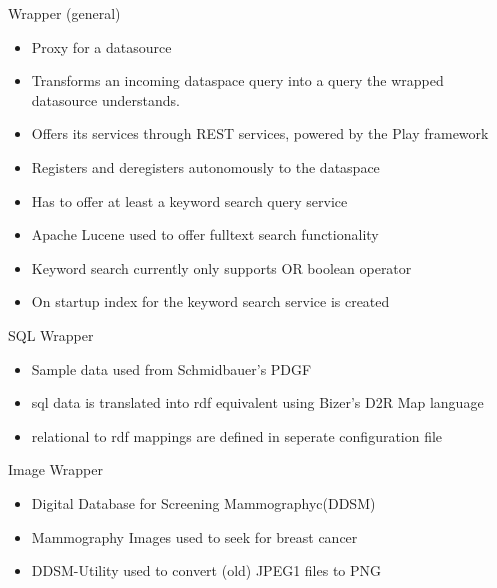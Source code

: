 \begin{frame}{Wrapper (general)}
\begin{itemize}
    \item Proxy for a datasource
    \item Transforms an incoming dataspace query into a query the wrapped datasource understands.
    \item Offers its services through REST services, powered by the Play framework \cite{Play}
    \item Registers and deregisters autonomously to the dataspace 
    \item Has to offer at least a keyword search query service
    \item Apache Lucene used to offer fulltext search functionality \cite{LuceneCore}
    \item Keyword search currently only supports OR boolean operator
    \item On startup index for the keyword search service is created
\end{itemize}
\end{frame}

\begin{frame}{SQL Wrapper}
    \begin{itemize}
    \item Sample data used from Schmidbauer's PDGF \cite{SchmidbauerBachelorThesis}
    \item sql data is translated into rdf equivalent using Bizer's D2R Map language \cite{D2rMap_aDatabaseToRdfMappingLanguage}
    \item relational to rdf mappings are defined in seperate configuration file
    \end{itemize}
\end{frame}

\begin{frame}{Image Wrapper}
    \begin{itemize}
    \item Digital Database for Screening Mammographyc(DDSM)\cite{DDSM}
    \item Mammography Images used to seek for breast cancer
    \item DDSM-Utility used to convert (old) JPEG1 files to PNG \cite{DDSM_UTILITY} 
    \end{itemize}
\end{frame}

